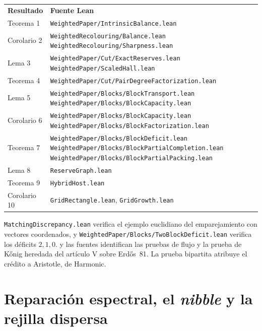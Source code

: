 \documentclass[11pt]{article}
\newcommand{\leanname}[1]{\texttt{\detokenize{#1}}}
\newcommand{\leanref}[1]{\texttt{#1.lean}}
\begin{document}
\smallskip
\begingroup
\renewcommand{\arraystretch}{1.10}
\noindent\begin{tabularx}{\linewidth}{@{}l>{\raggedright\arraybackslash}X@{}}
\textbf{Resultado} & \textbf{Fuente Lean} \\[2pt]
Teorema 1 & \nolinkurl{WeightedPaper/IntrinsicBalance.lean} \\
Corolario 2 & \nolinkurl{WeightedRecolouring/Balance.lean}\newline
  \nolinkurl{WeightedRecolouring/Sharpness.lean} \\
Lema 3 & \nolinkurl{WeightedPaper/Cut/ExactReserves.lean}\newline
  \nolinkurl{WeightedPaper/ScaledHall.lean} \\
Teorema 4 & \nolinkurl{WeightedPaper/Cut/PairDegreeFactorization.lean} \\
Lema 5 & \nolinkurl{WeightedPaper/Blocks/BlockTransport.lean}\newline
  \nolinkurl{WeightedPaper/Blocks/BlockCapacity.lean} \\
Corolario 6 & \nolinkurl{WeightedPaper/Blocks/BlockCapacity.lean}\newline
  \nolinkurl{WeightedPaper/Blocks/BlockFactorization.lean} \\
Teorema 7 & \nolinkurl{WeightedPaper/Blocks/BlockDeficit.lean}\newline
  \nolinkurl{WeightedPaper/Blocks/BlockPartialCompletion.lean}\newline
  \nolinkurl{WeightedPaper/Blocks/BlockPartialPacking.lean} \\
Lema 8 & \leanref{ReserveGraph} \\
Teorema 9 & \leanref{HybridHost} \\
Corolario 10 & \leanref{GridRectangle}, \leanref{GridGrowth} \\
\end{tabularx}\par
\endgroup

\smallskip
\noindent
\leanref{MatchingDiscrepancy} verifica el ejemplo euclidiano del emparejamiento con vectores coordenados, y \nolinkurl{WeightedPaper/Blocks/TwoBlockDeficit.lean} verifica los déficits \(2,1,0\). \leanname{PROVENANCE.md} y las fuentes identifican las pruebas de flujo y la prueba de K\H{o}nig heredada del artículo V sobre Erd\H{o}s~81. La prueba bipartita atribuye el crédito a Aristotle, de Harmonic.

\section*{Reparación espectral, el \emph{nibble} y la rejilla dispersa}
\end{document}
